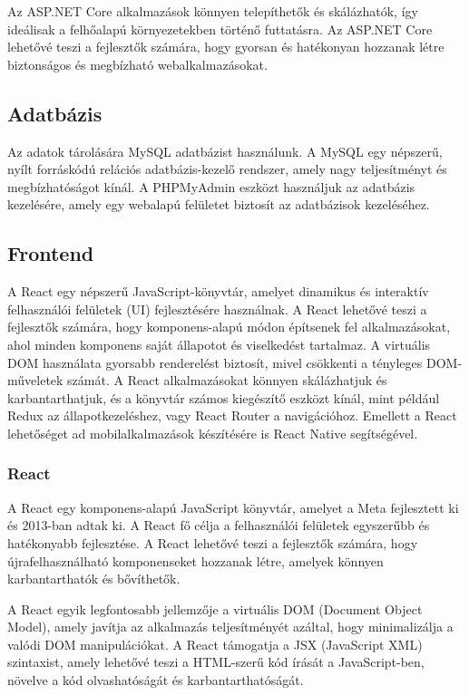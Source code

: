 \documentclass[colorlinks]{thesis-kando}
\theoremstyle{definition}
\theoremstyle{remark}
\begin{document}
Az ASP.NET Core alkalmazások könnyen telepíthetők és skálázhatók, így ideálisak a felhőalapú környezetekben történő futtatásra. Az ASP.NET Core lehetővé teszi a fejlesztők számára, hogy gyorsan és hatékonyan hozzanak létre biztonságos és megbízható webalkalmazásokat.

\subsection{Adatbázis}
Az adatok tárolására MySQL adatbázist használunk. A MySQL egy népszerű, nyílt forráskódú relációs adatbázis-kezelő rendszer, amely nagy teljesítményt és megbízhatóságot kínál. A PHPMyAdmin eszközt használjuk az adatbázis kezelésére, amely egy webalapú felületet biztosít az adatbázisok kezeléséhez.

\subsection{Frontend}
A React egy népszerű JavaScript-könyvtár, amelyet dinamikus és interaktív felhasználói felületek (UI) fejlesztésére használnak. A React lehetővé teszi a fejlesztők számára, hogy komponens-alapú módon építsenek fel alkalmazásokat, ahol minden komponens saját állapotot és viselkedést tartalmaz. A virtuális DOM használata gyorsabb renderelést biztosít, mivel csökkenti a tényleges DOM-műveletek számát. A React alkalmazásokat könnyen skálázhatjuk és karbantarthatjuk, és a könyvtár számos kiegészítő eszközt kínál, mint például Redux az állapotkezeléshez, vagy React Router a navigációhoz. Emellett a React lehetőséget ad mobilalkalmazások készítésére is React Native segítségével.



\subsubsection{React}
A React egy komponens-alapú JavaScript könyvtár, amelyet a Meta fejlesztett ki és 2013-ban adtak ki. A React fő célja a felhasználói felületek egyszerűbb és hatékonyabb fejlesztése. A React lehetővé teszi a fejlesztők számára, hogy újrafelhasználható komponenseket hozzanak létre, amelyek könnyen karbantarthatók és bővíthetők.

A React egyik legfontosabb jellemzője a virtuális DOM (Document Object Model), amely javítja az alkalmazás teljesítményét azáltal, hogy minimalizálja a valódi DOM manipulációkat. A React támogatja a JSX (JavaScript XML) szintaxist, amely lehetővé teszi a HTML-szerű kód írását a JavaScript-ben, növelve a kód olvashatóságát és karbantarthatóságát.
\end{document}
